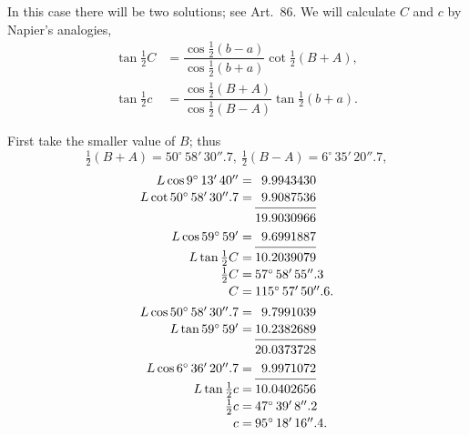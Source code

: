 \documentclass{book}[2004/02/16]
\begin{document}
\begin{mainmatter}
\begin{spacing}{1.3}
In this case there will be two solutions; see Art.\ 86. We
will calculate $C$ and $c$ by Napier's analogies,
\begin{align*}
\tan \tfrac12 C &= \dfrac{\cos \tfrac12 (b - a)}{\cos \tfrac12 (b + a)}\cot \tfrac12 (B + A),\\[2ex]
\tan \tfrac12 c &= \dfrac{\cos \tfrac12 (B + A)}{\cos \tfrac12 (B - A)}\tan \tfrac12 (b + a).
\end{align*}

First take the smaller value of $B$; thus
\[
  \tfrac12 (B + A) = 50^\circ\, 58'\, 30''.7,\
  \tfrac12 (B - A) =  6^\circ\, 35'\, 20''.7,
\]
\[
\begin{array}{r@{\:}r@{}c}
  L\cos  9^\circ\, 13'\, 40''   = & \phantom{1} 9.9943430  \\[.3ex]
  L\cot 50^\circ\, 58'\, 30''.7 = & \phantom{1} 9.9087536\\[-1.5ex]
&\hrulefill\\[-.3ex]
                                     &            19.9030966  \\[.6ex]
  L\cos 59^\circ\, 59'          = & \phantom{1} 9.6991887\\[-1.5ex]
&\hrulefill\\[-.3ex]
  L\tan\tfrac{1}{2} C                  = &            10.2039079\\[.3ex]
       \tfrac{1}{2} C                  =
&\multicolumn{2}{@{}l}{ 57^\circ\, 58'\, 55''.3}\\[.3ex]
                C                  =
&\multicolumn{2}{@{}l}{ 115^\circ\, 57'\, 50''.6.}\\[1ex]
  L\cos 50^\circ\, 58'\, 30''.7 = & \phantom{1} 9.7991039  \\[.3ex]
  L\tan 59^\circ\, 59'          = &            10.2382689\\[-1.5ex]
&\hrulefill\\[-.3ex]
                                     &            20.0373728  \\[.6ex]
  L\cos 6^\circ\, 36'\, 20''.7  = & \phantom{1} 9.9971072\\[-1.5ex]
&\hrulefill\\[-.3ex]
  L\tan\tfrac{1}{2} c                  = &            10.0402656\\[.3ex]
       \tfrac{1}{2} c                  =
&\multicolumn{2}{@{}l}{ 47^\circ\, 39'\, 8''.2}\\[.3ex]
                c                  =
&\multicolumn{2}{@{}l}{ 95^\circ\, 18'\, 16''.4.}

\end{array}\]
\end{spacing}
\end{mainmatter}
\end{document}
